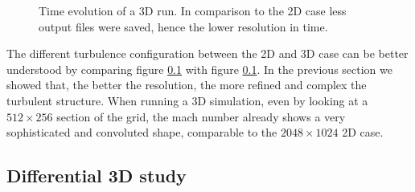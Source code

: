 {\begin{figure}[t!]
	\caption{Time evolution of a 3D run. In comparison to the 2D case less output files were saved, hence the lower resolution in time.}
	\label{3dsingle}
\end{figure}
The different turbulence configuration between the 2D and 3D case can be better understood by comparing figure \ref{} with figure \ref{}. In the previous section we showed that, the better the resolution, the more refined and complex the turbulent structure. When running a 3D simulation, even by looking at a $512 \times 256$ section of the grid, the mach number already shows a very sophisticated and convoluted shape, comparable to the $2048 \times 1024$ 2D case.
}
\subsection{Differential 3D study}
